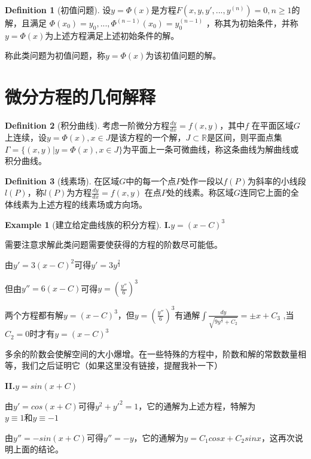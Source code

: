 \documentclass[oneside]{book}
\theoremstyle{definition}
\theoremstyle{definition}
\theoremstyle{cth}
\newtheorem{definition}{Definition}[section]
\theoremstyle{cnthm}
\newtheorem{example}{Example}[section]
\begin{document}
		\begin{definition}[初值问题]
			
			设$y=\Phi (x)$是方程$\displaystyle F(x,y,y',...,y^{(n)})=0,n\geq 1$的解，且满足
			$\Phi (x_0)=y_0,...,\Phi ^{(n-1)}(x_0)=y_0^{(n-1)}$
			，称其为初始条件，并称$y=\Phi (x)$为上述方程满足上述初始条件的解。
			
			称此类问题为初值问题，称$y=\Phi (x)$为该初值问题的解。
			
		\end{definition}

	\section{微分方程的几何解释}

		\begin{definition}[积分曲线]
			考虑一阶微分方程$\displaystyle \frac{dy}{dx}=f(x,y)$，其中$f$
			在平面区域$G$上连续，设$y=\Phi (x),x\in J$是该方程的一个解，$J\subset \mathbb{R}$是区间，则平面点集
			$\Gamma =\{(x,y)|y=\Phi (x),x\in J \}$为平面上一条可微曲线，称这条曲线为解曲线或积分曲线。
		\end{definition}
		
		\begin{definition}[线素场]
			在区域$G$中的每一个点$P$处作一段以$f(P)$为斜率的小线段$l(P)$，称$l(P)$为方程$\displaystyle \frac{dy}{dx}=f(x,y)$
			在点$P$处的线素。称区域$G$连同它上面的全体线素为上述方程的线素场或方向场。
		\end{definition}
		
		\begin{example}[建立给定曲线族的积分方程]
			\textbf{I.}$y=(x-C)^3$
			
			需要注意求解此类问题需要使获得的方程的阶数尽可能低。
			
			由$y'=3(x-C)^2$可得$y'=3y^{\frac{2}{3}}$
			
			但由$y''=6(x-C)$可得$y=(\frac{y''}{6})^3$
			
			两个方程都有解$y=(x-C)^3$，但$\displaystyle y=(\frac{y''}{6})^3$有通解$\displaystyle \int \frac{dy}{\sqrt{9y^{\frac{4}{3}}+C_2}}=\pm x+C_3$
			,当$C_2=0$时才有$y=(x-C)^3$
			
			多余的阶数会使解空间的大小爆增。在一些特殊的方程中，阶数和解的常数数量相等，我们之后证明它（如果这里没有链接，提醒我补一下）
			
			\textbf{II.}$y=sin(x+C)$
			
			由$y'=cos(x+C)$可得$y^2+y'^2=1$，它的通解为上述方程，特解为$y\equiv 1 \text{和} y\equiv -1$
			
			由$y''=-sin(x+C)$可得$y''=-y$，它的通解为$y=C_1cosx+C_2sinx$，这再次说明上面的结论。
			
		\end{example}
		
\end{document}
